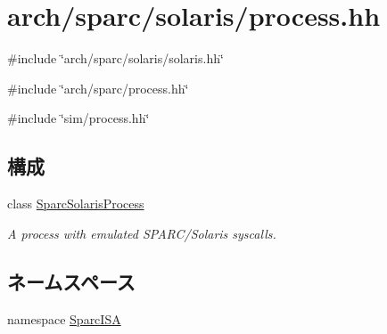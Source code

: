 \hypertarget{arch_2sparc_2solaris_2process_8hh}{
\section{arch/sparc/solaris/process.hh}
\label{arch_2sparc_2solaris_2process_8hh}
}
{\ttfamily \#include \char`\"{}arch/sparc/solaris/solaris.hh\char`\"{}}\par
{\ttfamily \#include \char`\"{}arch/sparc/process.hh\char`\"{}}\par
{\ttfamily \#include \char`\"{}sim/process.hh\char`\"{}}\par
\subsection*{構成}
\begin{DoxyCompactItemize}
\item 
class \hyperlink{classSparcISA_1_1SparcSolarisProcess}{SparcSolarisProcess}
\begin{DoxyCompactList}\small\item\em A process with emulated SPARC/Solaris syscalls. \item\end{DoxyCompactList}\end{DoxyCompactItemize}
\subsection*{ネームスペース}
\begin{DoxyCompactItemize}
\item 
namespace \hyperlink{namespaceSparcISA}{SparcISA}
\end{DoxyCompactItemize}
